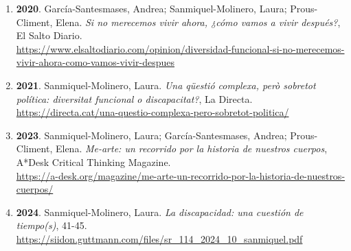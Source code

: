 \begin{enumerate}
\item {\bf 2020}. García-Santesmases, Andrea; Sanmiquel-Molinero, Laura; Prous-Climent, Elena. {\it Si no merecemos vivir ahora, ¿cómo vamos a vivir después?}, El Salto Diario. \\ \url{ https://www.elsaltodiario.com/opinion/diversidad-funcional-si-no-merecemos-vivir-ahora-como-vamos-vivir-despues }\filbreak
\item {\bf 2021}. Sanmiquel-Molinero, Laura. {\it Una qüestió complexa, però sobretot política: diversitat funcional o discapacitat?}, La Directa. \\ \url{ https://directa.cat/una-questio-complexa-pero-sobretot-politica/ }\filbreak
\item {\bf 2023}. Sanmiquel-Molinero, Laura; García-Santesmases, Andrea; Prous-Climent, Elena. {\it Me-arte: un recorrido por la historia de nuestros cuerpos}, A*Desk Critical Thinking Magazine. \\ \url{ https://a-desk.org/magazine/me-arte-un-recorrido-por-la-historia-de-nuestros-cuerpos/ }\filbreak
\item {\bf 2024}. Sanmiquel-Molinero, Laura. {\it La discapacidad: una cuestión de tiempo(s)}, 41-45. \\ \url{ https://siidon.guttmann.com/files/sr\_114\_2024\_10\_sanmiquel.pdf }\filbreak
\end{enumerate} 
